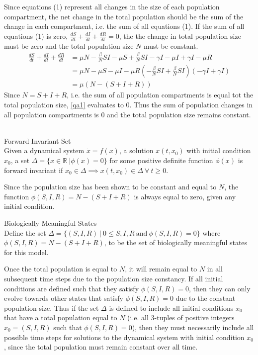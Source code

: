 Since equations (1) represent all changes in the size of each population compartment, the net change in the total population should be the sum of the change in each compartment, i.e. the sum of all equations (1).
If the sum of all equations (1) is zero, $\frac{dS}{dt} + \frac{dI}{dt} + \frac{dR}{dt} = 0$, the the change in total population size must be zero and the total population size $N$ must be constant.
\begin{align}
   \frac{dS}{dt} + \frac{dI}{dt} + \frac{dR}{dt} &= \mu N -\frac{\beta}{N} SI - \mu S + \frac{\beta}{N} SI - \gamma I - \mu I + \gamma I - \mu R\\
   &= \mu N - \mu S - \mu I - \mu R (-\frac{\beta}{N} SI + \frac{\beta}{N} SI) (- \gamma I  + \gamma I)\\
   &= \mu (N - (S + I + R)) \label{qa1}
\end{align}
Since $N = S + I + R$, i.e. the sum of all population compartments is equal tot the total population size, \ref{qa1} evaluates to 0.
Thus the sum of population changes in all population compartments is 0 and the total population size remains constant.\\\\
\begin{definition}{Forward Invariant Set\\}
Given a dynamical system $\dot{x}=f(x)$, a solution $x(t,x_0)$ with initial condition $x_0$, a set $\Delta = \{x \in {\mathbb R}\ | \phi(x) = 0 \}$ for some positive definite function $\phi(x)$ is forward invariant if $x_0 \in \Delta \implies x(t,x_0) \in \Delta\ \forall\ t \geq 0$.
\end{definition}
Since the population size has been shown to be constant and equal to $N$, the function $\phi(S,I,R) = N - (S+I+R)$ is always equal to zero, given any initial condition.
\begin{definition}{Biologically Meaningful States\\}
Define the set $\Delta = \{(S,I,R)\ |\ 0 \leq S,I,R \ \textrm{and}\ \phi(S,I,R) = 0\}$ where $\phi(S,I,R) = N - (S+I+R)$, to be the set of biologically meaningful states for this model.
\end{definition}
Once the total population is equal to $N$, it will remain equal to $N$ in all subsequent time steps due to the population size constancy.
If all initial conditions are defined such that they satisfy $\phi(S,I,R) = 0$, then they can only evolve towards other states that satisfy $\phi(S,I,R) = 0$ due to the constant population size.
Thus if the set $\Delta$ is defined to include all initial conditions $x_0$ that have a total population equal to $N$ (i.e. all 3-tuples of positive integers $x_0 = (S,I,R)$ such that $\phi(S,I,R) = 0$), then they must necessarily include all possible time steps for solutions to the dynamical system with initial condition $x_0$, since the total population must remain constant over all time.

